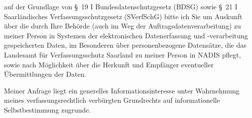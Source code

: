 auf der Grundlage von §~19 I Bundesdatenschutzgesetz (BDSG) sowie
§~21 I Saarländisches Verfassungsschutzgesetz (SVerfSchG) bitte ich Sie um Auskunft
über die durch Ihre Behörde (auch im Weg der Auftragsdatenverarbeitung) zu meiner
Person in Systemen der elektronischen Datenerfassung und -verarbeitung gespeicherten
Daten, im Besonderen über personenbezogene Datensätze, die das Landesamt für Verfassungsschutz
Saarland zu meiner Person in NADIS pflegt, sowie nach Möglichkeit über die Herkunft
und Empfänger eventueller Übermittlungen der Daten.

Meiner Anfrage liegt ein generelles Informationsinteresse unter Wahrnehmung
meines verfassungsrechtlich verbürgten Grundrechts auf informationelle
Selbstbestimmung zugrunde.

